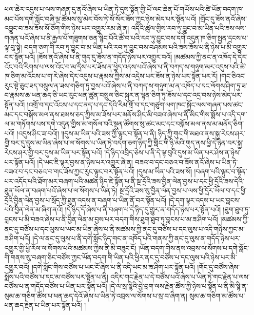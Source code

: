 ཕལ་ཆེར་འདུས་པ་ལས་གཞན་དུ་ནའོ་ཞེས་པ་ཡིན་ཏེ་དུས་སྟོན་གྱི་ཡོ་ལང་ཆེན་པོ་གཡོས་པའི་ཚེ་ཡོན་བདག་ཁ་མང་པོས་དགེ་སློང་བཞི་ལྔ་ཚོམས་སུ་མེར་བོས་ཏེ་སོ་སོར་ཟོས་ཀྱང་ཉེས་མེད་པར་སྟོན་པའོ། །གྲོང་དུ་ཟོས་ནའོ་ཞེས་འབྱུང་བ་ཟས་ཟོས་སོ་ཅོག་གིས་ཉེས་པར་འགྱུར་རམ་ཞེ་ན། འདིའི་ཚུལ་གྱིས་རབ་ཏུ་བྱུང་བ་མ་ཡིན་པའི་ཟས་ལས་གཞན་པའོ་ཞེས་པ་ནི་རྒྱལ་པོ་གཟུགས་ཅན་སྙིང་པོའི་ཚོ་བ་པའི་རབ་ཏུ་བྱུང་བས་དགེ་འདུན་ཁ་ཅིག་སྤྱན་དྲངས་པ་ལྟ་བུ་སྟེ། བདག་ཅག་གི་རབ་ཏུ་བྱུང་བ་མ་ཡིན་པའི་རབ་ཏུ་བྱུང་བས་བཤམས་པའི་ཟས་ཟོས་པ་ནི་ཉེས་པ་མི་འགྱུར་བར་སྟོན་པའོ། །ཟོས་ནའོ་ཞེས་པ་ནི་གུད་དུ་ཟོས་ན་གདོད་ཉེས་པར་འགྱུར་བའོ། །མཚམས་ཀྱི་ནང་ན་འཁོད་དེ་དེར་འོང་བའི་རིགས་པ་ལས་འོང་བ་མ་དྲིས་པར་ཟོས་ན་ཕྱེད་འདས་པའོ་ཞེས་པ་ནི་བཀད་ས་གཉུག་མར་འདུས་པའི་ཚེ་ཁ་ཅིག་མ་འོངས་པ་ག་རེ་ཞེས་དེར་འདུས་པ་རྣམས་ཀྱིས་མ་འདྲེས་པར་ཟོས་ན་ཉེས་པར་སྟོན་པར་རོ། །གང་ཅིའང་རུང་སྟེ་ཅུང་ཟད་བསྲུལ་ན་ཟས་གཅིག་ཏུ་བྱས་པའོ་ཞེས་པ་ནི་བཀད་ས་གཉུག་མ་ན་འཁོད་པ་དང་ལོགས་ཤིག་ཏུ་ཟ་བ་རྣམས་ཆ་ཡན་ཆད་ཅི་ཡང་རུང་ཕན་ཚུན་བསྲུལ་ཅིང་སྐུར་ན་ལྷན་ཅིག་ཏུ་ཟོས་པ་དང་འདྲ་བས་ཉེས་མེད་པར་སྟོན་པའོ། །འགྲོ་བ་དང་འོངས་པ་དང་ནད་པ་དང་དེའི་རིམ་གྲོ་བ་དང་གཙུག་ལག་ཁང་སྐྱོང་ལས་གཞན་པས་ཚང་མང་དང་བསྐོས་མལ་ནས་ཐམས་ཅད་ཀྱིས་མ་ཟོས་པར་མནོས་ཤིང་མི་བཟའ་ཞེས་པ་ནི་མིང་གིས་སྨོས་པ་འདི་དག་ལ་མ་གཏོགས་པས་དགེ་འདུན་གྱིས་མ་གསོལ་བའི་སྔུན་ཚོགས་སུ་ཚང་མང་དང་བསྐོས་མལ་ནས་མ་མནོད་ཅིག་པའོ། །འདུས་ཤིང་ཟ་བའོ།། །།དུས་མ་ཡིན་པའི་ཟས་ཀྱི་ལྟུང་བ་སྟོན་པ་ནི། ཉིད་ཀྱི་གུང་གི་མཐའ་ནས་སྐྱ་རེངས་ཤར་གྱི་བར་དུ་དུས་མ་ཡིན་ཞེས་པ་ལ་སོགས་པ་ཡིན་ཏེ་བདག་ཅག་ཉིད་ཀྱི་གླིང་གི་ཉི་མའི་གུད་ནས་ཕྱི་དེ་ཉིན་བར་སྐྱ་རེངས་ཤར་གྱི་བར་དུས་མ་ཡིན་པར་སྟོན་པའོ། །དེ་ཉིད་འབྲིད་ཅེས་པ་ནི་དེ་ལྟ་བུའི་དུས་མ་ཡིན་པར་ཤེས་ན་ཉེས་པར་སྟོན་པའོ། །དེ་ཡང་ཇི་ལྟར་བྱས་ན་ཉེས་པར་འགྱུར་ཞེ་ན། བཟའ་བ་དང་བཅའ་བ་ཟོས་ནའོ་ཞེས་པ་ཡིན་ཏེ་བཟའ་བ་དང་བཅའ་བ་གང་ཟོས་ཀྱང་རུང་ལྟུང་བར་སྟོན་པའོ། །དུས་མ་ཡིན་པའི་ཟས་སོ། །བཞག་པའི་ལྟུང་བ་སྟོན་པར་འདོད་པའི་ཐོག་མར་བཞག་པའི་མཚན་ཉིད་ཇེ་སྟོན་པ་ནི་སྔ་དྲོའི་ཟས་བྱིན་ལེན་བྱས་པ་དང་ཕྱི་དྲོའི་ཟས་དེའི་ཐུན་ཡོལ་ན་བཞག་པའོ་ཞེས་པ་ལ་སོགས་པ་ཡིན་ཏེ། སྔ་དྲོའི་ཟས་སུ་བྱིན་ལེན་བྱས་པ་ལས་ཕྱི་དྲོར་ཡོལ་བ་དང་ཕྱི་དྲོའི་བྱིན་ལེན་བྱས་པ་སྲོད་ཀྱི་ཐུན་འདས་ན་བཞག་པ་ཡིན་ནོ་བར་སྟོན་པའོ། །དེ་དག་ལྟར་འདས་པ་ཡང་བླངས་པའི་བྱིན་ལེན་མ་ཞིག་ནའོ། །དེ་ཉིད་དོ་ཞེས་པ་ནི་བཞག་པ་དེ་ཉིད་དུ་གྱུར་ན་གདོད་ཉེས་པར་སྟོན་པའོ། །ཐུག་ཐུབ་ཏུ་བླངས་པ་མི་བཟའ་ཞེས་པ་ནི་བྱིན་ལེན་མ་བྱས་པར་བདག་གིས་ཐུག་ཐུབ་ཏུ་བླངས་པ་མ་ཟ་ཤིག་པའོ། །མཚམས་ཀྱི་ནང་དུ་བཙོས་པ་དང་ལུས་པ་ཡང་མ་ཡིན་ཞེས་པ་ནི་མཚམས་ཀྱི་ནང་དུ་བཙོས་པ་དང་ལུས་པ་འདི་གཉིས་ཀྱང་མ་ཟ་ཤིག་པའོ། །དེ་ལ་ནང་དུ་ལུས་པ་ནི་དགེ་སློང་ཉིད་གང་ན་འཁོད་པའི་གནས་ཀྱི་ནང་དུ་ལུས་ན་གདོད་ཉེས་པར་འགྱུར་གྱི་ཕྱི་རོལ་ལ་སོགས་པའི་མཚམས་ཀྱིས་ནི་མི་བཟུང་ངོ། །ཡོན་བདག་གིས་ནས་འབྲས་ལ་སོགས་པ་དགེ་སློང་གི་གནས་སུ་བཞག་ཅིང་བཙོས་ཀྱང་ཡོན་བདག་གི་ཡིན་པའི་ཕྱིར་ནང་དུ་བཙོས་པ་དང་ལུས་པའི་ཉེས་པར་མི་འགྱུར་བའོ། །དགེ་སློང་གིས་བཙོས་པ་ཡང་ངོ་ཞེས་པ་ནི་འདི་ཡང་མ་ཟ་ཤིག་པར་སྟོན་པའོ། །གོང་དུ་བཙོས་ཞེས་སྨོས་པའི་བཙོས་པ་དང་མ་བཙོས་པར་སྟོན་པ་ནི། འདིར་གང་རྗེན་པ་དེ་བཙོས་པའོ་ཞེས་པ་ཡིན་ཏེ་གང་རྗེན་པ་ལས་བཙོས་པ་ན་གདོད་བཙོས་པ་ཡིན་པར་སྟོན་པའོ། །དེ་ལ་སྲ་སྙིའི་བྱེ་བྲག་ལས་རྗེན་ཚོས་ཀྱི་ཉེས་པ་སྟོན་པ་ནི་མི་སྙི་ན་སུམ་ཆ་གཅིག་ཚོས་པ་ཕན་ཆད་དེའོ་ཞེས་པ་ཡིན་ཏེ་འབྲས་ལ་སོགས་པ་སྲ་བ་ཞིག་ན། སུམ་ཆ་གཅིག་མ་ཚོས་པ་ཕན་ཆད་རྗེན་པ་ཡིན་པར་སྟོན་པའོ། །
